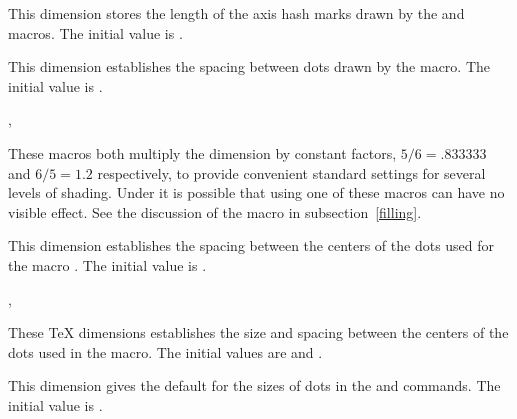 \documentclass[letterpaper]{article}
\begin{document}
\begin{cd}
%
\end{cd}

This dimension stores the length of the axis hash marks drawn by the
 and  macros. The initial value is \dim{4pt}.

\begin{cd}
%
\end{cd}

This dimension establishes the spacing between dots drawn by the
 macro. The initial value is \dim{1pt}.

\begin{cd}
, %
%
\end{cd}

These macros both multiply the  dimension by constant
factors, $5/6=.833333$ and $6/5=1.2$ respectively, to provide convenient
standard settings for several levels of shading. Under \MF{} it is
possible that using one of these macros can have no visible effect. See
the discussion of the  macro in subsection~\ref{filling}.

\begin{cd}
%
\end{cd}

This dimension establishes the spacing between the centers of the dots
used for the macro . The initial value is \dim{10pt}.

\begin{cd}
, %
%
\end{cd}

These \TeX{} dimensions establishes the size and spacing between the
centers of the dots used in the  macro. The initial values
are \dim{0.5pt} and \dim{3pt}.

\begin{cd}
%
%
\end{cd}

This dimension gives the default for the sizes of dots in the 
and  commands. The initial value is \dim{0.5pt}.
\end{document}
